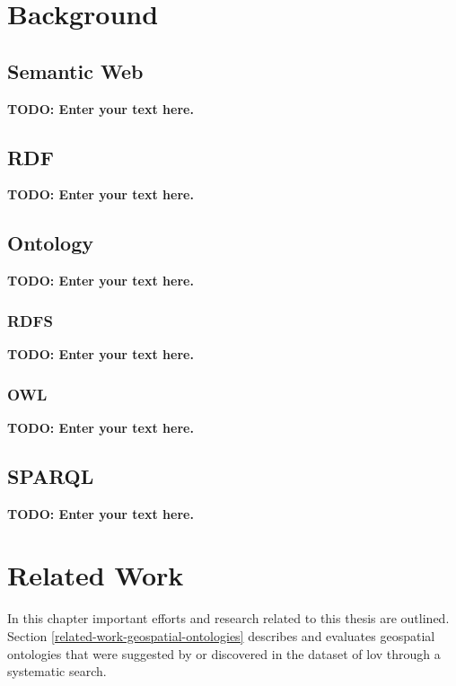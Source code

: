 \documentclass[draft,final]{vutinfth} %
\newcommand{\todo}[1]{{\color{red}\textbf{TODO: {#1}}}} %
\begin{document}
\chapter{Background}
\label{background-chapter}

\section{Semantic Web}
\todo{Enter your text here.}

\section{RDF}
\todo{Enter your text here.}

\section{Ontology}
\todo{Enter your text here.}

\subsection{RDFS}
\todo{Enter your text here.}

\subsection{OWL}
\todo{Enter your text here.}

\section{SPARQL}
\todo{Enter your text here.}

\chapter{Related Work}
\label{related-work-chapter}

In this chapter important efforts and research related to this thesis are outlined. Section \ref{related-work-geospatial-ontologies} describes and evaluates geospatial ontologies that were suggested by \cite{tandy_spatial_????} or discovered in the dataset of \gls{lov} through a systematic search.  
\end{document}
